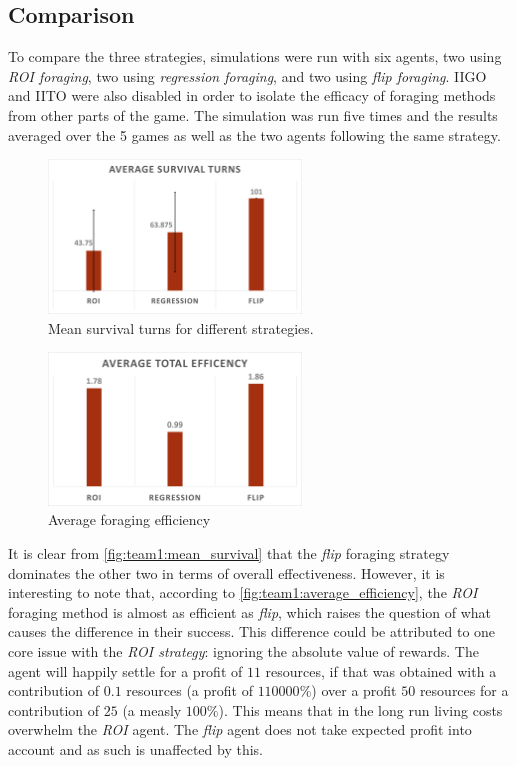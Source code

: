 \subsection{Comparison}

To compare the three strategies, simulations were run with six agents, two using \emph{ROI foraging}, two using \emph{regression foraging}, and two using \emph{flip foraging}. IIGO and IITO were also disabled in order to isolate the efficacy of foraging methods from other parts of the game. The simulation was run five times and the results averaged over the 5 games as well as the two agents following the same strategy.

\begin{figure}[H] 
\centering
\includegraphics[width=0.6\textwidth]{09_team1_agentdesign/images/mean_survival_turns}
\caption{Mean survival turns for different strategies.}
\label{fig:team1:mean_survival}
\end{figure} 

\begin{figure}[H] 
\centering
\includegraphics[width=0.6\textwidth]{09_team1_agentdesign/images/total_efficiency}
\caption{Average foraging efficiency}
\label{fig:team1:average_efficiency}
\end{figure} 

It is clear from \autoref{fig:team1:mean_survival} that the \emph{flip} foraging strategy dominates the other two in terms of overall effectiveness. However, it is interesting to note that, according to \autoref{fig:team1:average_efficiency}, the \emph{ROI} foraging method is almost as efficient as \emph{flip}, which raises the question of what causes the difference in their success. This difference could be attributed to one core issue with the \emph{ROI strategy}: ignoring the absolute value of rewards. The agent will happily settle for a profit of $11$ resources, if that was obtained with a contribution of $0.1$ resources (a profit of $110000\%$) over a profit $50$ resources for a contribution of $25$ (a measly $100\%$). This means that in the long run living costs overwhelm the \emph{ROI} agent. The \emph{flip} agent does not take expected profit into account and as such is unaffected by this.

